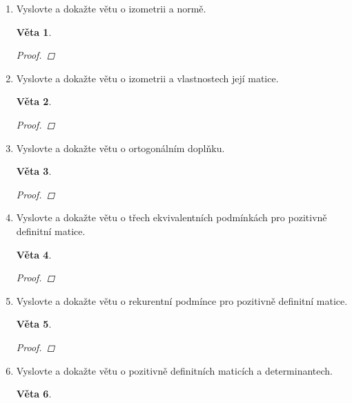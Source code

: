 \documentclass[10pt,a4paper]{article}
\theoremstyle{plain}
\newtheorem{veta}{Věta}
\theoremstyle{definition}
\begin{document}
\begin{enumerate}
\item Vyslovte a dokažte větu o izometrii a normě.


\begin{veta}

\begin{proof}

\end{proof}
\end{veta}

\item Vyslovte a dokažte větu o izometrii a vlastnostech její matice.


\begin{veta}

\begin{proof}

\end{proof}
\end{veta}

\item Vyslovte a dokažte větu o ortogonálním doplňku.


\begin{veta}

\begin{proof}

\end{proof}
\end{veta}

\item Vyslovte a dokažte větu o třech ekvivalentních podmínkách pro pozitivně definitní matice.


\begin{veta}

\begin{proof}

\end{proof}
\end{veta}

\item Vyslovte a dokažte větu o rekurentní podmínce pro pozitivně definitní matice.


\begin{veta}

\begin{proof}

\end{proof}
\end{veta}

\item Vyslovte a dokažte větu o pozitivně definitních maticích a determinantech.


\begin{veta}


\end{veta}
\end{enumerate}
\end{document}
